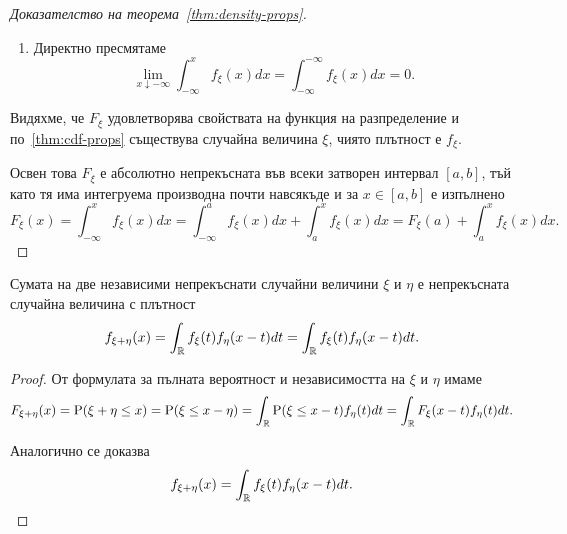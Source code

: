 \documentclass[numbers=endperiod, DIV=15, bibliography=totocnumbered]{scrartcl}
\begin{document}
\begin{proof}[Доказателство на теорема~\ref{thm:density-props}]
\begin{enumerate}
    \item Директно пресмятаме
    \begin{displaymath}
      \lim_{x \downarrow -\infty} \int_{-\infty}^x f_\xi(x) dx
      =
      \int_{-\infty}^{-\infty} f_\xi(x) dx
      =
      0.
    \end{displaymath}
  \end{enumerate}

  Видяхме, че $F_\xi$ удовлетворява свойствата на функция на разпределение и по~\ref{thm:cdf-props} съществува случайна величина $\xi$, чиято плътност е $f_\xi$.

  Освен това $F_\xi$ е абсолютно непрекъсната във всеки затворен интервал $[a, b]$, тъй като тя има интегруема производна почти навсякъде и за $x \in [a, b]$ е изпълнено
  \begin{displaymath}
    F_\xi(x)
    =
    \int_{-\infty}^x f_\xi(x) dx
    =
    \int_{-\infty}^a f_\xi(x) dx + \int_a^x f_\xi(x) dx
    =
    F_\xi(a) + \int_a^x f_\xi(x) dx.
  \end{displaymath}
\end{proof}

\begin{proposition}\label{thm:convolution}
  Сумата на две независими непрекъснати случайни величини $\xi$ и $\eta$ е непрекъсната случайна величина с плътност
  \begin{displaymath}
    f_{\xi + \eta} (x)
    =
    \int_{\mathbb{R}} f_\xi(t) f_\eta(x - t) dt
    =
    \int_{\mathbb{R}} f_\xi(t) f_\eta(x - t) dt.
  \end{displaymath}
\end{proposition}
\begin{proof} От формулата за пълната вероятност и независимостта на $\xi$ и $\eta$ имаме
  \begin{displaymath}
    F_{\xi + \eta} (x)
    =
    \operatorname{P}(\xi + \eta \leq x)
    =
    \operatorname{P}(\xi \leq x - \eta)
    =
    \int_{\mathbb{R}} \operatorname{P}(\xi \leq x - t) f_\eta(t) dt
    =
    \int_{\mathbb{R}} F_\xi(x - t) f_\eta(t) dt.
  \end{displaymath}

  Аналогично се доказва
  \begin{displaymath}
    f_{\xi + \eta} (x)
    =
    \int_{\mathbb{R}} f_\xi(t) f_\eta(x - t) dt.
  \end{displaymath}
\end{proof}
\end{document}
